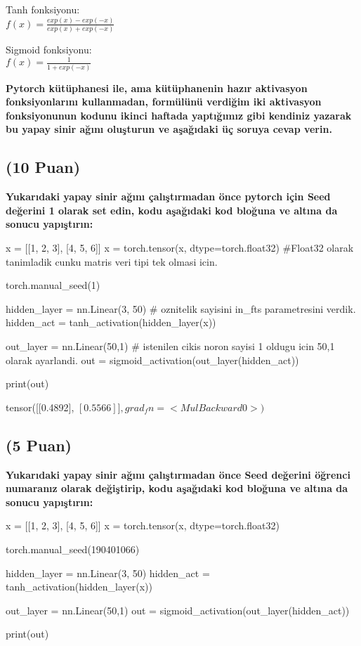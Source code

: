 \documentclass[11pt]{article}
\begin{document}
Tanh fonksiyonu:\\
$f(x) = \frac{exp(x) - exp(-x)}{exp(x) + exp(-x)}$
\vspace{.2in}

Sigmoid fonksiyonu:\\
$f(x) = \frac{1}{1 + exp(-x)}$

\vspace{.2in}
 \textbf{Pytorch kütüphanesi ile, ama kütüphanenin hazır aktivasyon fonksiyonlarını kullanmadan, formülünü verdiğim iki aktivasyon fonksiyonunun kodunu ikinci haftada yaptığımız gibi kendiniz yazarak bu yapay sinir ağını oluşturun ve aşağıdaki üç soruya cevap verin.}
 
\subsection{(10 Puan)} \textbf{Yukarıdaki yapay sinir ağını çalıştırmadan önce pytorch için Seed değerini 1 olarak set edin, kodu aşağıdaki kod bloğuna ve altına da sonucu yapıştırın:}

\begin{python}
x = [[1, 2, 3], [4, 5, 6]]
x = torch.tensor(x, dtype=torch.float32) #Float32 olarak tanimladik cunku matris veri tipi tek olmasi icin.

torch.manual_seed(1)

hidden_layer = nn.Linear(3, 50) # oznitelik sayisini in_fts parametresini verdik.
hidden_act = tanh_activation(hidden_layer(x))

out_layer = nn.Linear(50,1) # istenilen cikis noron sayisi 1 oldugu icin 50,1 olarak ayarlandi.
out = sigmoid_activation(out_layer(hidden_act))

print(out)
\end{python}

tensor([[0.4892], 
$       [0.5566]], grad_fn=<MulBackward0>)
$

\subsection{(5 Puan)} \textbf{Yukarıdaki yapay sinir ağını çalıştırmadan önce Seed değerini öğrenci numaranız olarak değiştirip, kodu aşağıdaki kod bloğuna ve altına da sonucu yapıştırın:}

\begin{python}
x = [[1, 2, 3], [4, 5, 6]]
x = torch.tensor(x, dtype=torch.float32) 

torch.manual_seed(190401066)

hidden_layer = nn.Linear(3, 50) 
hidden_act = tanh_activation(hidden_layer(x))

out_layer = nn.Linear(50,1) 
out = sigmoid_activation(out_layer(hidden_act))

print(out)
\end{python}
\end{document}
